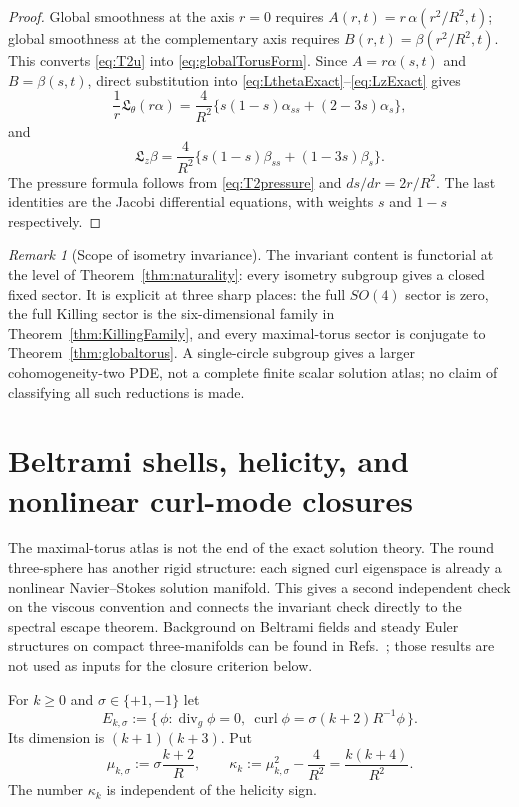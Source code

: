 \documentclass[aps,prd,reprint,superscriptaddress,nofootinbib,floatfix]{revtex4-2}
\theoremstyle{definition}
\theoremstyle{remark}
\newtheorem{remark}[theorem]{Remark}
\newcommand{\divg}{\operatorname{div}_g}
\begin{document}
\begin{proof}
	Global smoothness at the axis $r=0$ requires $A(r,t)=r\,\alpha(r^2/R^2,t)$; global smoothness at the complementary axis requires $B(r,t)=\beta(r^2/R^2,t)$.  This converts \eqref{eq:T2u} into \eqref{eq:globalTorusForm}.  Since $A=r\alpha(s,t)$ and $B=\beta(s,t)$, direct substitution into \eqref{eq:LthetaExact}--\eqref{eq:LzExact} gives
	\[
		\frac1r\mathfrak L_\theta(r\alpha)
		=\frac4{R^2}\{s(1-s)\alpha_{ss}+(2-3s)\alpha_s\},
	\]
	and
	\[
		\mathfrak L_z\beta
		=\frac4{R^2}\{s(1-s)\beta_{ss}+(1-3s)\beta_s\}.
	\]
	The pressure formula follows from \eqref{eq:T2pressure} and $ds/dr=2r/R^2$.  The last identities are the Jacobi differential equations, with weights $s$ and $1-s$ respectively.
\end{proof}

\begin{remark}[Scope of isometry invariance]\label{rem:isometryMeaning}
	The invariant content is functorial at the level of Theorem~\ref{thm:naturality}: every isometry subgroup gives a closed fixed sector.  It is explicit at three sharp places: the full $SO(4)$ sector is zero, the full Killing sector is the six-dimensional family in Theorem~\ref{thm:KillingFamily}, and every maximal-torus sector is conjugate to Theorem~\ref{thm:globaltorus}.  A single-circle subgroup gives a larger cohomogeneity-two PDE, not a complete finite scalar solution atlas; no claim of classifying all such reductions is made.
\end{remark}





\section{Beltrami shells, helicity, and nonlinear curl-mode closures}\label{sec:beltrami}

The maximal-torus atlas is not the end of the exact solution theory.  The round
three-sphere has another rigid structure: each signed curl eigenspace is already
a nonlinear Navier--Stokes solution manifold.  This gives a second independent
check on the viscous convention and connects the invariant check directly to the
spectral escape theorem.  Background on Beltrami fields and steady Euler
structures on compact three-manifolds can be found in
Refs.~\cite{PeraltaSlobodeanu2023,EncisoPeralta2012}; those results are not
used as inputs for the closure criterion below.

For $k\ge0$ and $\sigma\in\{+1,-1\}$ let
\begin{equation}
	E_{k,\sigma}:=\{\,\phi:\divg\phi=0,\
	\operatorname{curl}\phi=\sigma (k+2)R^{-1}\phi\,\}.
\end{equation}
Its dimension is $(k+1)(k+3)$.  Put
\begin{equation}
	\mu_{k,\sigma}:=\sigma\frac{k+2}{R},
	\qquad
	\kappa_k:=\mu_{k,\sigma}^2-\frac4{R^2}=\frac{k(k+4)}{R^2}.
	\label{eq:kappak}
\end{equation}
The number $\kappa_k$ is independent of the helicity sign.
\end{document}
